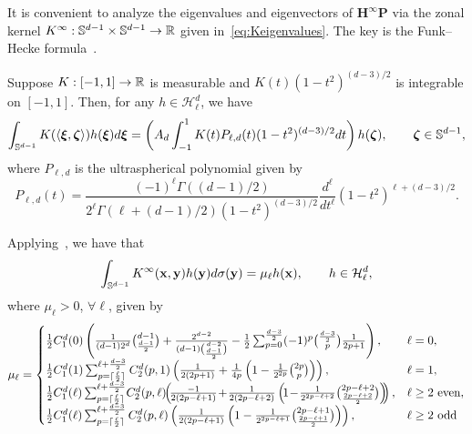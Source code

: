 It is convenient to analyze the eigenvalues and eigenvectors of $\mathbf H^\infty \mathbf P$ via the zonal kernel ${K}^\infty: {\mathbb{S}}^{d-1} \times {\mathbb{S}}^{d-1} \rightarrow \mathbb{R}$ given in~\cref{eq:Keigenvalues}. The key is the Funk--Hecke formula~\citep{seeley1966spherical}.
\begin{thm}\label{thm.funkhecke}
Suppose $K: [-1,1] \rightarrow \mathbb{R}$ is measurable and $K(t) (1-t^2)^{(d-3)/2}$ is integrable on $[-1,1]$. Then, for any $h \in \mathcal{H}_\ell^d$, we have
\begin{equation}
    \int_{{\mathbb{S}}^{d-1}} K(\langle \boldsymbol{\xi}, \boldsymbol{\zeta} \rangle) h(\boldsymbol{\xi}) d\boldsymbol{\xi} = \left(A_d \int_{-1}^1 K(t) P_{\ell,d}(t) (1-t^2)^{(d-3)/2} dt\right) h(\boldsymbol{\zeta}), \qquad \boldsymbol{\zeta} \in {\mathbb{S}}^{d-1},
\end{equation}
where $P_{\ell,d}$ is the ultraspherical polynomial given by
\begin{equation}
    P_{\ell,d}(t) = \frac{(-1)^\ell \Gamma((d-1)/2)}{2^\ell \Gamma(\ell + (d-1)/2) (1-t^2)^{(d-3)/2}} \frac{d^\ell}{dt^\ell} (1-t^2)^{\ell + (d-3)/2}.
\end{equation}
\end{thm}
Applying~,
we have that 
\begin{equation*}
    \int_{{\mathbb{S}}^{d-1}} {K}^\infty(\mathbf{x},\mathbf{y}) h(\mathbf{y}) d\sigma(\mathbf{y}) = \mu_\ell h(\mathbf{x}), \qquad h \in \mathcal{H}_\ell^d,
\end{equation*}
where $\mu_\ell > 0$, $\forall \ell$, given by~\citep{basri} 
\begin{equation*}
    \mu_\ell = 
    \begin{cases}
    \frac{1}{2} C^d_1(0) \left(\frac{1}{(d-1)2^{d}} {d-1 \choose \frac{d-1}{2}} + \frac{2^{d-2}}{(d-1)\binom{d-2}{\frac{d-1}{2}}} - \frac{1}{2} \sum_{p=0}^{\frac{d-3}{2}} (-1)^p {\frac{d-3}{2} \choose p} \frac{1}{2p + 1}\right), & \ell = 0, \\
    \frac{1}{2} C^d_1(1) \sum_{p = \ceil{\frac{\ell}{2}}}^{\ell + \frac{d-3}{2}} C^d_{2}(p,1) \left(\frac{1}{2(2p+1)} + \frac{1}{4p} \left(1 - \frac{1}{2^{2p}} {2p \choose p}\right)\right), & \ell = 1,\\
    \frac{1}{2} C^d_1(\ell) \sum_{p = \ceil{\frac{\ell}{2}}}^{\ell + \frac{d-3}{2}}\! C^d_2(p,\ell) \!\!\left(\!\frac{-1}{2(2p-\ell+1)} \!+\! \frac{1}{2(2p-\ell+2)} \left(\!1 \!-\! \frac{1}{2^{2p-\ell+2}}{2p-\ell+2 \choose \frac{2p-\ell+2}{2}}\right)\!\!\right), & \ell \geq 2 \text{ even},\\
    \frac{1}{2} C^d_1(\ell) \sum_{p = \ceil{\frac{\ell}{2}}}^{\ell + \frac{d-3}{2}} C^d_2(p,\ell) \left(\frac{1}{2(2p-\ell+1)}\left(1 - \frac{1}{2^{2p-\ell+1}}{2p-\ell+1 \choose \frac{2p-\ell+1}{2}}\right)\right), & \ell \geq 2 \text{ odd}
    \end{cases}
\end{equation*}
